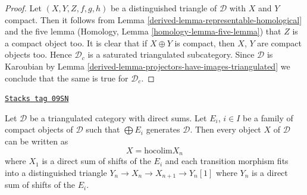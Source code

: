 \begin{proof}

Let $(X, Y, Z, f, g, h)$ be a distinguished triangle of $\mathcal{D}$
with $X$ and $Y$ compact. Then it follows from
Lemma \ref{derived-lemma-representable-homological}
and the five lemma
(Homology, Lemma \ref{homology-lemma-five-lemma})
that $Z$ is a compact object too. It is clear that if $X \oplus Y$
is compact, then $X$, $Y$ are compact objects too. Hence
$\mathcal{D}_c$ is a saturated triangulated subcategory.
Since $\mathcal{D}$ is Karoubian by
Lemma \ref{derived-lemma-projectors-have-images-triangulated}
we conclude that the same is true for $\mathcal{D}_c$.
\end{proof}

\begin{lemma}
\label{derived-lemma-write-as-colimit}
\href{https://stacks.math.columbia.edu/tag/09SN}{\texttt{Stacks tag 09SN}}

Let $\mathcal{D}$ be a triangulated category with direct sums.
Let $E_i$, $i \in I$ be a family of compact objects of $\mathcal{D}$
such that $\bigoplus E_i$ generates $\mathcal{D}$.
Then every object $X$ of $\mathcal{D}$ can be written as
$$
X = \text{hocolim} X_n
$$
where $X_1$ is a direct sum of shifts of the $E_i$ and each transition
morphism fits into a distinguished triangle
$Y_n \to X_n \to X_{n + 1} \to Y_n[1]$
where $Y_n$ is a direct sum of shifts of the $E_i$.
\end{lemma}

